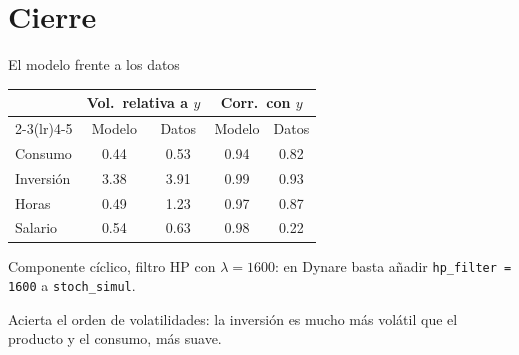 \section{Cierre}

\begin{frame}[label=vs-datos]{El modelo frente a los datos}
  \centering\small
  \renewcommand{\arraystretch}{1.25}
  \begin{tabular}{@{}lcccc@{}}
    \toprule
    & \multicolumn{2}{c}{\textbf{Vol.\ relativa a $y$}} & \multicolumn{2}{c}{\textbf{Corr.\ con $y$}}\\
    \cmidrule(lr){2-3}\cmidrule(lr){4-5}
    & Modelo & Datos & Modelo & Datos\\
    \midrule
    Consumo & 0.44 & 0.53 & 0.94 & 0.82\\
    Inversión & 3.38 & 3.91 & 0.99 & 0.93\\
    Horas & \num{0.49} & \num{1.23} & 0.97 & 0.87\\
    Salario & 0.54 & 0.63 & \num{0.98} & \num{0.22}\\
    \bottomrule
  \end{tabular}
  \par\vspace{0.3cm}\raggedright\normalsize
  Componente cíclico, filtro HP con $\lambda=1600$: en Dynare basta añadir
  \texttt{hp\_filter = 1600} a \texttt{stoch\_simul}.\par
  \vspace{0.2cm}
  Acierta el orden de volatilidades: la inversión es mucho más volátil que el producto
  y el consumo, más suave.
\end{frame}

